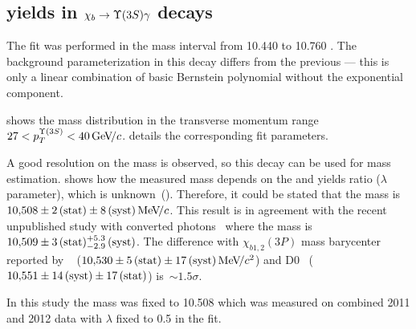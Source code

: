 \subsection{\texorpdfstring{\chib}{xb} yields in
    \texorpdfstring{$\chib \to \Y3S \gamma$}{xb --> Y(3S) gamma} decays}
\label{sec:chib:ups3s:fit}

The fit was performed in the mass interval from  10.440 to 10.760 \gevcc. 
The background parameterization in this decay differs from the previous ---
this is only a linear combination of basic Bernstein polynomial without the
exponential component.

 shows the mass distribution in the
transverse momentum range $27<p_T^{\Y3S}<40\gevc$.
 details the corresponding fit parameters.




A good resolution on the \chiboneThreeP mass is observed, so this decay can be
used for \chiboneThreeP mass estimation.  shows how
the measured \chiboneThreeP mass depends on the \chiboneThreeP and \chibtwoThreeP
yields ratio ($\lambda$ parameter), which is unknown~(). 
Therefore, it could be stated that the \chiboneThreeP mass is $10{,}508 \pm 2\mathrm{\,(stat)} \pm 8\mathrm{\,(syst)} {\mathrm{\,Me\kern -0.1em V\!/}c}$.
This result is in agreement with the recent unpublished 
\lhcb study with converted photons~\cite{edwige} where the \chiboneThreeP mass is
$10{,}509 \pm 3\mathrm{\,(stat)}{}^{+5.3}_{-2.9}\mathrm{\,(syst)}$. The difference with
$\chi_{b1,2}(3P)$ mass barycenter reported by \atlas~\cite{Aad:2011ih} ($10{,}530 \pm 5\mathrm{\,(stat)}
\pm 17\mathrm{\,(syst)} {\mathrm{\,Me\kern -0.1em V\!/}c^2}$) and D0~\cite{Abazov:2012gh}  ($10{,}551 \pm 14\mathrm{\,(syst)} \pm 17\mathrm{\,(stat)}$)
is~$\sim{}1.5\sigma$.




In this study the mass was fixed to 10.508 \gevcc which was measured 
on combined 2011 and 2012 data with $\lambda$ fixed to 0.5 in the fit.





